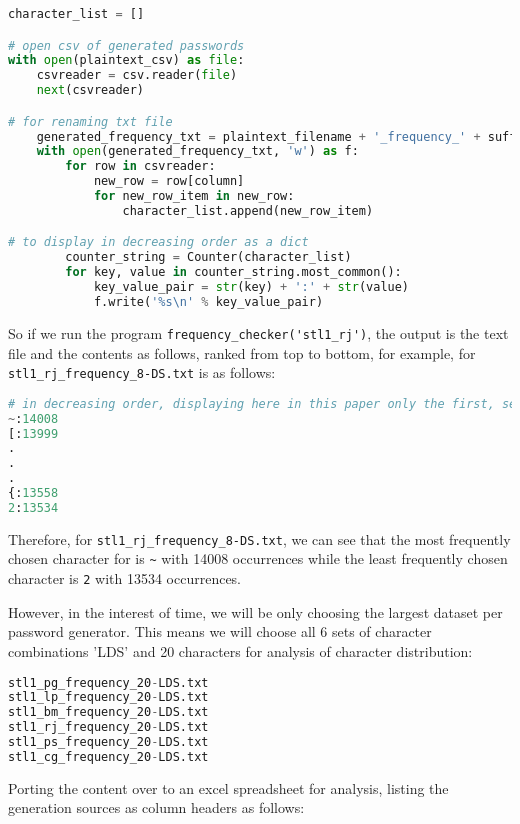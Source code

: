 \documentclass[letterpaper,twocolumn,10pt]{article}
\begin{document}
\begin{lstlisting}[language=python, frame=none]
character_list = []

# open csv of generated passwords
with open(plaintext_csv) as file:
    csvreader = csv.reader(file)
    next(csvreader)

# for renaming txt file
    generated_frequency_txt = plaintext_filename + '_frequency_' + suffix + '.txt'
    with open(generated_frequency_txt, 'w') as f:
        for row in csvreader:
            new_row = row[column]                    
            for new_row_item in new_row:
                character_list.append(new_row_item)

# to display in decreasing order as a dict
        counter_string = Counter(character_list)
        for key, value in counter_string.most_common():
            key_value_pair = str(key) + ':' + str(value)
            f.write('%s\n' % key_value_pair)
\end{lstlisting}

So if we run the program \lstinline{frequency_checker('stl1_rj')}, the output is the text file and the contents as follows, ranked from top to bottom, for example, for \lstinline{stl1_rj_frequency_8-DS.txt} is as follows:

\begin{lstlisting}[language=python, frame=none]
# in decreasing order, displaying here in this paper only the first, second, second-last and last key-value pair
~:14008
[:13999
.
.
.
{:13558
2:13534
\end{lstlisting}

Therefore, for \lstinline{stl1_rj_frequency_8-DS.txt}, we can see that the most frequently chosen character for is \lstinline{~} with 14008 occurrences while the least frequently chosen character is \lstinline{2} with 13534 occurrences.

However, in the interest of time, we will be only choosing the largest dataset per password generator. This means we will choose all 6 sets of character combinations 'LDS' and 20 characters for analysis of character distribution: 

\begin{lstlisting}[language=python, frame=none]
stl1_pg_frequency_20-LDS.txt
stl1_lp_frequency_20-LDS.txt
stl1_bm_frequency_20-LDS.txt
stl1_rj_frequency_20-LDS.txt
stl1_ps_frequency_20-LDS.txt
stl1_cg_frequency_20-LDS.txt
\end{lstlisting}

Porting the content over to an excel spreadsheet for analysis, listing the generation sources as column headers as follows:
\end{document}
